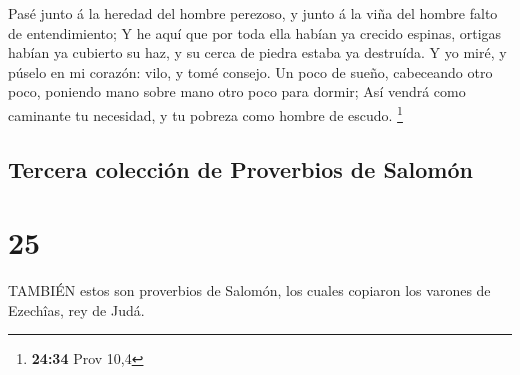  Pasé junto á la heredad del hombre perezoso, y junto á la
viña del hombre falto de entendimiento;  Y he aquí que por
toda ella habían ya crecido espinas, ortigas habían ya cubierto su haz,
y su cerca de piedra estaba ya destruída.  Y yo miré, y
púselo en mi corazón: vilo, y tomé consejo.  Un poco de
sueño, cabeceando otro poco, poniendo mano sobre mano otro poco para
dormir;  Así vendrá como caminante tu necesidad, y tu
pobreza como hombre de escudo. \footnote{\textbf{24:34} Prov 10,4}

\hypertarget{tercera-colecciuxf3n-de-proverbios-de-salomuxf3n}{%
\subsection{Tercera colección de Proverbios de
Salomón}\label{tercera-colecciuxf3n-de-proverbios-de-salomuxf3n}}

\hypertarget{section-24}{%
\section{25}\label{section-24}}

 TAMBIÉN estos son proverbios de Salomón, los cuales
copiaron los varones de Ezechîas, rey de Judá.

